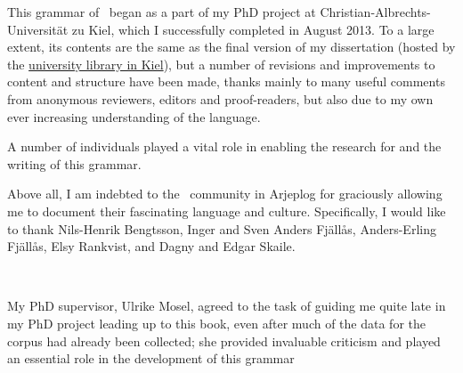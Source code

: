%


\label{acknowledgements}

This grammar of \PS\ began as a part of my PhD project at Christian-Albrechts-Universität zu Kiel, which I successfully completed in August 2013. To a large extent, its contents are the same as the final version of my dissertation (hosted by the \href{http://macau.uni-kiel.de/receive/dissertation_diss_00013059}{university library in Kiel}), but a number of revisions and improvements to content and structure have been made, thanks mainly to many useful comments from anonymous reviewers, editors and proof-readers, but also due to my own ever increasing understanding of the language. 

A number of individuals played a vital role in enabling the research for and the writing of this grammar. 

\vspace{10pt}
Above all, I am indebted to the \PS\ community in Arjeplog for graciously allowing me to document their fascinating language and culture. %
Specifically, I would like to thank Nils-Henrik Bengtsson, Inger and Sven Anders Fjällås, Anders-Erling Fjällås, Elsy Rankvist, and Dagny and Edgar Skaile. 

{\centering{}\\}
\vspace{10pt}

My PhD supervisor, Ulrike Mosel, agreed to the task of guiding me quite late in my PhD project leading up to this book, even after much of the data for the corpus had already been collected; she provided invaluable criticism and played an essential role in the development of this grammar \textendash\  %

